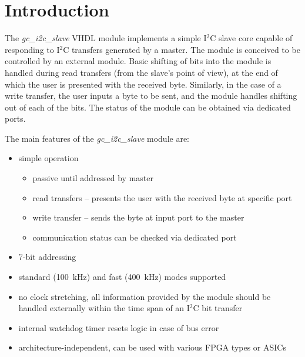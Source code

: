 \documentclass[a4paper,11pt]{article}
\begin{document}
\pagebreak
{}
\setcounter{page}{1}
\section{Introduction}
\label{sec:intro}

The \textit{gc\_i2c\_slave} VHDL module implements a simple I$^2$C 
slave core capable of responding to I$^2$C transfers generated by a master. The module 
is conceived to be controlled by an external module. Basic shifting of bits into the 
module is handled during read transfers (from the slave's point of view), at the end of 
which the user is presented with the received byte. Similarly, in the case of a write 
transfer, the user inputs a byte to be sent, and the module handles shifting out of each 
of the bits. The status of the module can be obtained via dedicated ports.

The main features of the \textit{gc\_i2c\_slave} module are:
\begin{itemize}
  \item simple operation
  \begin{itemize}
    \item passive until addressed by master
    \item read transfers -- presents the user with the received byte at specific port
    \item write transfer -- sends the byte at input port to the master
    \item communication status can be checked via dedicated port
  \end{itemize}
  \item 7-bit addressing
  \item standard (100~kHz) and fast (400~kHz) modes supported
  \item no clock stretching, all information provided by the module should be handled
  externally within the time span of an I$^2$C bit transfer
  \item internal watchdog timer resets logic in case of bus error
  \item architecture-independent, can be used with various FPGA types or ASICs
\end{itemize}

\end{document}
